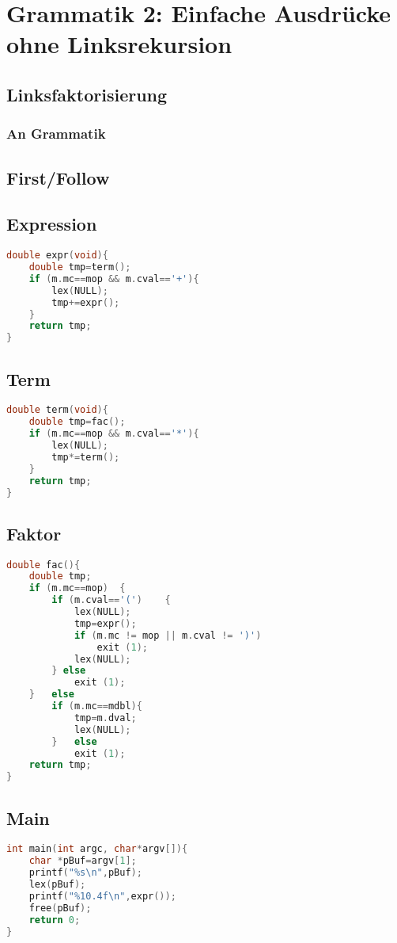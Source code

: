 \section{Grammatik 2: Einfache Ausdrücke ohne Linksrekursion}
\subsection{Linksfaktorisierung}
\subsubsection*{An Grammatik}
\subsection{First/Follow}
\subsection{Expression}
\begin{lstlisting}[language=C]
double expr(void){
	double tmp=term();
	if (m.mc==mop && m.cval=='+'){
		lex(NULL); 
		tmp+=expr();
	}
	return tmp;
}
\end{lstlisting}
\subsection{Term}
\begin{lstlisting}[language=C]
double term(void){
	double tmp=fac();
	if (m.mc==mop && m.cval=='*'){
		lex(NULL);
		tmp*=term();
	}
	return tmp;
}
\end{lstlisting}
\subsection{Faktor}
\begin{lstlisting}[language=C]
double fac(){
	double tmp;
	if (m.mc==mop)	{
		if (m.cval=='(')	{
			lex(NULL);
			tmp=expr();
			if (m.mc != mop || m.cval != ')')
				exit (1);
			lex(NULL);
		} else 
			exit (1);
	}	else
		if (m.mc==mdbl){
			tmp=m.dval;
			lex(NULL);
		}	else 
			exit (1);
	return tmp;
}
\end{lstlisting}
\subsection{Main}
\begin{lstlisting}[language=C]
int main(int argc, char*argv[]){
	char *pBuf=argv[1];
	printf("%s\n",pBuf);
	lex(pBuf);
	printf("%10.4f\n",expr());
	free(pBuf);
	return 0;
}
\end{lstlisting}
